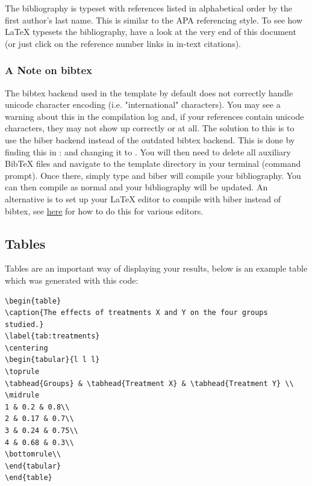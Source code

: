 The bibliography is typeset with references listed in alphabetical order by the first author's last name.
This is similar to the APA referencing style.
To see how \LaTeX{} typesets the bibliography, have a look at the very end of this document (or just click on the reference number links in in-text citations).

\subsubsection{A Note on bibtex}

The bibtex backend used in the template by default does not correctly handle unicode character encoding (i.e. "international" characters).
You may see a warning about this in the compilation log and, if your references contain unicode characters, they may not show up correctly or at all.
The solution to this is to use the biber backend instead of the outdated bibtex backend.
This is done by finding this in :  and changing it to .
You will then need to delete all auxiliary BibTeX files and navigate to the template directory in your terminal (command prompt).
Once there, simply type  and biber will compile your bibliography.
You can then compile  as normal and your bibliography will be updated.
An alternative is to set up your LaTeX editor to compile with biber instead of bibtex, see \href{http://tex.stackexchange.com/questions/154751/biblatex-with-biber-configuring-my-editor-to-avoid-undefined-citations/}{here} for how to do this for various editors.

\subsection{Tables}

Tables are an important way of displaying your results, below is an example table which was generated with this code:

{\small
\begin{verbatim}
\begin{table}
\caption{The effects of treatments X and Y on the four groups studied.}
\label{tab:treatments}
\centering
\begin{tabular}{l l l}
\toprule
\tabhead{Groups} & \tabhead{Treatment X} & \tabhead{Treatment Y} \\
\midrule
1 & 0.2 & 0.8\\
2 & 0.17 & 0.7\\
3 & 0.24 & 0.75\\
4 & 0.68 & 0.3\\
\bottomrule\\
\end{tabular}
\end{table}
\end{verbatim}
}

